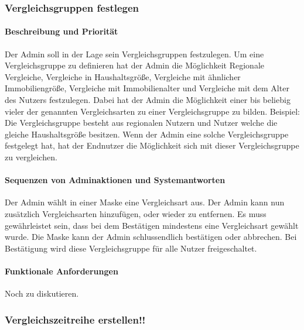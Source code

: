 \subsubsection{Vergleichsgruppen festlegen}
\paragraph{Beschreibung und Priorität}
Der Admin soll in der Lage sein Vergleichsgruppen festzulegen. Um eine Vergleichsgruppe zu definieren hat der Admin die Möglichkeit Regionale Vergleiche, Vergleiche in Haushaltsgröße, Vergleiche mit ähnlicher Immobiliengröße, Vergleiche mit Immobilienalter und Vergleiche mit dem Alter des Nutzers festzulegen. Dabei hat der Admin die Möglichkeit einer bis beliebig vieler der genannten Vergleichsarten zu einer Vergleichsgruppe zu bilden. Beispiel: Die Vergleichsgruppe besteht aus regionalen Nutzern und Nutzer welche die gleiche Haushaltsgröße besitzen. Wenn der Admin eine solche Vergleichsgruppe festgelegt hat, hat der Endnutzer die Möglichkeit sich mit dieser Vergleichsgruppe zu vergleichen.
\paragraph{Sequenzen von Adminaktionen und Systemantworten}
Der Admin wählt in einer Maske eine Vergleichsart aus. Der Admin kann nun zusätzlich Vergleichsarten hinzufügen, oder wieder zu entfernen. Es muss gewährleistet sein, dass bei dem Bestätigen mindestens eine Vergleichsart gewählt wurde. Die Maske kann der Admin schlussendlich bestätigen oder abbrechen. Bei Bestätigung wird diese Vergleichsgruppe für alle Nutzer freigeschaltet.
\paragraph{Funktionale Anforderungen}
Noch zu diskutieren.


\subsubsection{Vergleichszeitreihe erstellen!!}